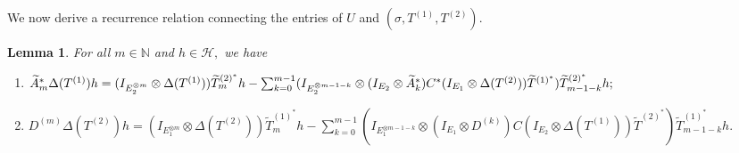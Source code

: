 \documentclass[12pt]{amsart}
\numberwithin{equation}{section}
\theoremstyle{plain}
\newtheorem{lemma}[theorem]{Lemma}
\newcommand{\ot}{\otimes}
\newcommand{\wt}{\widetilde}
\newcommand{\wT}{\wt{T}}
\begin{document}
We now derive a recurrence relation connecting the entries of $U$ and $(\sigma, T^{(1)}, T^{(2)}).$

\begin{lemma}\label{JJ9}
	For all $m\in\mathbb{N}$ and $h\in \mathcal{H},$ we have
	\begin{enumerate}
	\item $\widetilde{A}_m^*\Delta(T^{(1)})h = (I_{E_2^{\ot m}}\ot \Delta(T^{(1)}))\wT_m^{(2)^*}h - \sum_{k=0}^{m-1} (I_{E_2^{\ot m-1-k}}\ot (I_{E_2}\ot \widetilde{A}_k^*)C^*(I_{E_1}\ot \Delta(T^{(2)})) \\\wT^{(1)^*})\wT_{m-1-k}^{(2)^*}h;$
	
	\item $D^{(m)}\Delta(T^{(2)})h=(I_{E_1^{\ot m}}\ot \Delta(T^{(2)}))\wT_m^{(1)^*}h - \sum_{k=0}^{m-1} (I_{E_1^{\ot m-1-k}}\ot (I_{E_1}\ot D^{(k)})C(I_{E_2}\ot \Delta(T^{(1)}))\wT^{(2)^*})\wT_{m-1-k}^{(1)^*}h.$
	\end{enumerate}
\end{lemma}
\end{document}
